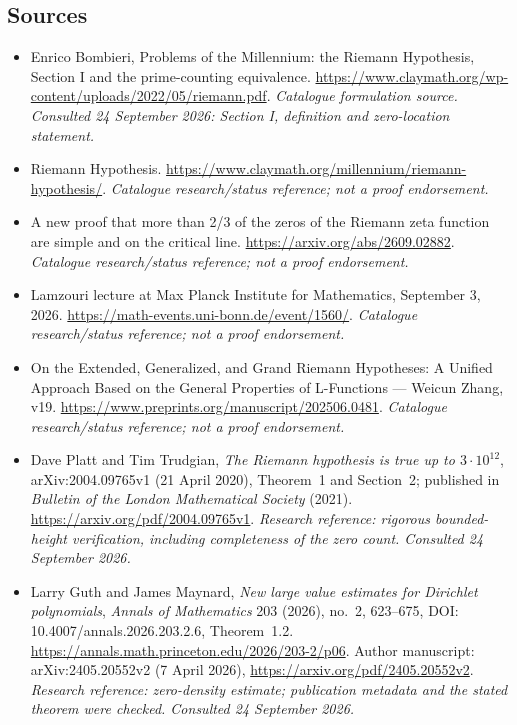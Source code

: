 \documentclass[11pt]{article}
\begin{document}
\subsection{Sources}
\begin{itemize}\raggedright
\item[\textnormal{[S1]}]\hypertarget{source:2:1}{} Enrico Bombieri, Problems of the Millennium: the Riemann Hypothesis, Section I and the prime-counting equivalence.
\url{https://www.claymath.org/wp-content/uploads/2022/05/riemann.pdf}.
{\small\textit{Catalogue formulation source. Consulted 24 September 2026: Section I, definition and zero-location statement.}}
\item[\textnormal{[S2]}]\hypertarget{source:2:2}{} Riemann Hypothesis.
\url{https://www.claymath.org/millennium/riemann-hypothesis/}.
{\small\textit{Catalogue research/status reference; not a proof endorsement.}}
\item[\textnormal{[S3]}]\hypertarget{source:2:3}{} A new proof that more than 2/3 of the zeros of the Riemann zeta function are simple and on the critical line.
\url{https://arxiv.org/abs/2609.02882}.
{\small\textit{Catalogue research/status reference; not a proof endorsement.}}
\item[\textnormal{[S4]}]\hypertarget{source:2:4}{} Lamzouri lecture at Max Planck Institute for Mathematics, September 3, 2026.
\url{https://math-events.uni-bonn.de/event/1560/}.
{\small\textit{Catalogue research/status reference; not a proof endorsement.}}
\item[\textnormal{[S5]}]\hypertarget{source:2:5}{} On the Extended, Generalized, and Grand Riemann Hypotheses: A Unified Approach Based on the General Properties of L-Functions — Weicun Zhang, v19.
\url{https://www.preprints.org/manuscript/202506.0481}.
{\small\textit{Catalogue research/status reference; not a proof endorsement.}}

\item[\textnormal{[E1]}]\hypertarget{extra:2:1}{} Dave Platt and Tim Trudgian,
\emph{The Riemann hypothesis is true up to $3\cdot10^{12}$},
arXiv:2004.09765v1 (21 April 2020), Theorem~1 and Section~2;
published in \emph{Bulletin of the London Mathematical Society} (2021).
\url{https://arxiv.org/pdf/2004.09765v1}.
{\small\textit{Research reference: rigorous bounded-height verification,
including completeness of the zero count. Consulted 24 September 2026.}}

\item[\textnormal{[E2]}]\hypertarget{extra:2:2}{} Larry Guth and James Maynard,
\emph{New large value estimates for Dirichlet polynomials},
\emph{Annals of Mathematics} 203 (2026), no.~2, 623--675,
DOI: 10.4007/annals.2026.203.2.6, Theorem~1.2.
\url{https://annals.math.princeton.edu/2026/203-2/p06}.
Author manuscript: arXiv:2405.20552v2 (7 April 2026),
\url{https://arxiv.org/pdf/2405.20552v2}.
{\small\textit{Research reference: zero-density estimate; publication metadata
and the stated theorem were checked. Consulted 24 September 2026.}}


\end{itemize}
\end{document}
